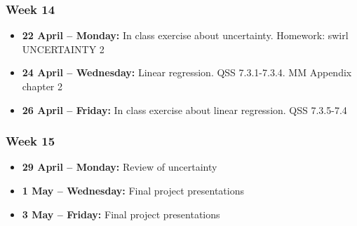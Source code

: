 \documentclass[a4paper,12pt]{article}
\begin{document}
\subsubsection*{Week 14}

\begin{itemize}
	\item \textbf{22 April -- Monday:} In class exercise about uncertainty. Homework: swirl UNCERTAINTY 2
	\item \textbf{24 April -- Wednesday:} Linear regression. QSS 7.3.1-7.3.4. MM Appendix chapter 2 
	\item \textbf{26 April -- Friday:} In class exercise about linear regression. QSS 7.3.5-7.4 
\end{itemize}

\subsubsection*{Week 15}

\begin{itemize}
	\item \textbf{29 April -- Monday:} Review of uncertainty 
	\item \textbf{1 May -- Wednesday:} Final project presentations
	\item \textbf{3 May -- Friday:} Final project presentations 
\end{itemize}
\end{document}
